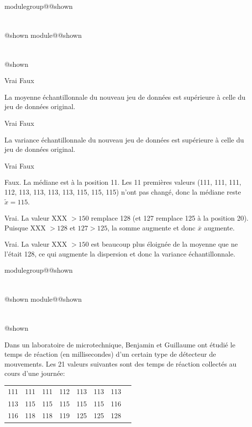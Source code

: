 \documentclass{Evaluation}
\makeatletter
\newcommand{\currentmodulekey}{}
\newcommand{\currentmoduletitle}{}
\newcommand{\currentgroupkey}{}
\newcommand{\currentgrouptitle}{}
\newcommand{\showmoduleifneeded}{%
  \ifx\currentgroupkey\empty\else
    \expandafter\ifx\csname modulegroup@\currentgroupkey @shown\endcsname\relax
      \section*{\currentgrouptitle}%
      \expandafter\gdef\csname modulegroup@\currentgroupkey @shown\endcsname{1}%
    \fi
  \fi
  \expandafter\ifx\csname module@\currentmodulekey @shown\endcsname\relax
    \section*{\currentmoduletitle}%
    \expandafter\gdef\csname module@\currentmodulekey @shown\endcsname{1}%
  \fi
}
\newenvironment{A23}{\showmoduleifneeded}{}
\newenvironment{H26}{\showmoduleifneeded}{}
\makeatother
\begin{document}
\begin{questions}
\begin{A23}
\begin{parts}
\begin{subparts}
    \begin{oneparcheckboxes}
        \choice Vrai
        \correctchoice Faux
    \end{oneparcheckboxes}


\subpart La moyenne échantillonnale du nouveau jeu de données est supérieure à celle du jeu de données original.

    \begin{oneparcheckboxes}
        \correctchoice Vrai
        \choice Faux
    \end{oneparcheckboxes}


\subpart La variance échantillonnale du nouveau jeu de données est supérieure à celle du jeu de données original.

    \begin{oneparcheckboxes}
        \correctchoice Vrai
        \choice Faux
    \end{oneparcheckboxes}


\end{subparts}

\begin{solution}
\begin{subparts}
\subpart Faux. La médiane est à la position 11. Les 11 premières valeurs (111, 111, 111, 112, 113, 113, 113, 113, 115, 115, 115) n'ont pas changé, donc la médiane reste $\tilde{x}=115$.

\subpart Vrai. La valeur XXX $> 150$ remplace 128 (et 127 remplace 125 à la position 20). Puisque XXX $> 128$ et $127 > 125$, la somme augmente et donc $\overline{x}$ augmente.

\subpart Vrai. La valeur XXX $> 150$ est beaucoup plus éloignée de la moyenne que ne l'était 128, ce qui augmente la dispersion et donc la variance échantillonnale.
\end{subparts}
\end{solution}

\end{parts}
\end{A23}

\begin{H26}
\question {} %
Dans un laboratoire de microtechnique, Benjamin et Guillaume ont étudié le temps de réaction (en millisecondes) d'un certain type de détecteur de mouvements. Les 21 valeurs suivantes sont des temps de réaction collectés au cours d'une journée:

\begin{center}
\begin{tabular}{  c c c c c c c c }
111  &111  &111  &112  &113  &113  &113 \\
113 &115  &115  &115  &115 &115 & 116 \\
116 & 118 & 118 & 119 & 125 &125 & 128\\
\end{tabular}
\end{center}


\end{H26}
\end{questions}
\end{document}
